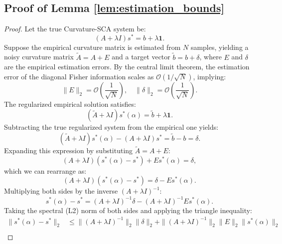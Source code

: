 \documentclass{article}
\theoremstyle{plain}
\theoremstyle{definition}
\theoremstyle{remark}
\begin{document}
\subsection{Proof of Lemma \ref{lem:estimation_bounds}}
\label{sec:appendix_lemma}

\begin{proof}
Let the true Curvature-SCA system be:
\begin{equation}
    (A + \lambda I) s^* = b + \lambda \mathbf{1}.
\end{equation}
Suppose the empirical curvature matrix is estimated from $N$ samples, yielding a noisy curvature matrix $\tilde{A} = A + E$ and a target vector $\tilde{b} = b + \delta$, where $E$ and $\delta$ are the empirical estimation errors.
By the central limit theorem, the estimation error of the diagonal Fisher information scales as $\mathcal{O}(1/\sqrt{N})$, implying:
\begin{equation}
    \|E\|_2 = \mathcal{O}\left(\frac{1}{\sqrt{N}}\right), \quad \|\delta\|_2 = \mathcal{O}\left(\frac{1}{\sqrt{N}}\right).
\end{equation}
The regularized empirical solution satisfies:
\begin{equation}
    (\tilde{A} + \lambda I) s^*(\alpha) = \tilde{b} + \lambda \mathbf{1}.
\end{equation}
Subtracting the true regularized system from the empirical one yields:
\begin{equation}
    (\tilde{A} + \lambda I) s^*(\alpha) - (A + \lambda I) s^* = \tilde{b} - b = \delta.
\end{equation}
Expanding this expression by substituting $\tilde{A} = A + E$:
\begin{equation}
    (A + \lambda I)(s^*(\alpha) - s^*) + E s^*(\alpha) = \delta,
\end{equation}
which we can rearrange as:
\begin{equation}
    (A + \lambda I)(s^*(\alpha) - s^*) = \delta - E s^*(\alpha).
\end{equation}
Multiplying both sides by the inverse $(A + \lambda I)^{-1}$:
\begin{equation}
    s^*(\alpha) - s^* = (A + \lambda I)^{-1} \delta - (A + \lambda I)^{-1} E s^*(\alpha).
\end{equation}
Taking the spectral (L2) norm of both sides and applying the triangle inequality:
\begin{align}
    \|s^*(\alpha) - s^*\|_2 &\le \|(A + \lambda I)^{-1}\|_2 \|\delta\|_2 + \|(A + \lambda I)^{-1}\|_2 \|E\|_2 \|s^*(\alpha)\|_2 \nonumber\\

\end{align}
\end{proof}
\end{document}
